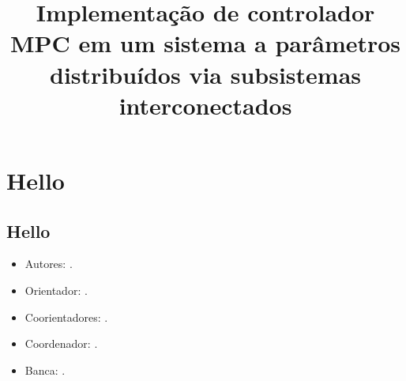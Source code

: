 \documentclass{tcc}
\title{Implementação de controlador MPC em um sistema a parâmetros distribuídos via subsistemas interconectados}
\begin{document}
    \maketitle{}
    
    \toc{}

    \chapter{Hello}%
    \label{chp:hello}

    \section{Hello}%
    \label{sec:hello}

    \begin{itemize}
        \item Autores: \getauthors{}.
        \item Orientador: \getorientador{}.
        \item Coorientadores: \getcoorientadores{}.
        \item Coordenador: \getcoordenador{}.
        \item Banca: .
    \end{itemize}
    
\end{document}
